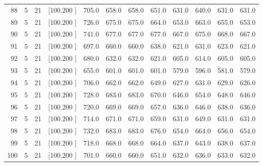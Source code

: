 \documentclass[12pt,a4paper]{article}
\begin{document}
\begin{center}
{\begin{tabular}{r r r r r r r r r r r r}
  88&  5& 21&[100.200   ]&   705.0&   658.0&   658.0&   651.0&   631.0&   640.0&   631.0&   631.0\\[-0.02in]
  89&  5& 21&[100.200   ]&   726.0&   675.0&   675.0&   664.0&   653.0&   663.0&   655.0&   653.0\\[-0.02in]
  90&  5& 21&[100.200   ]&   741.0&   677.0&   677.0&   677.0&   667.0&   675.0&   668.0&   667.0\\[-0.02in]
  91&  5& 21&[100.200   ]&   697.0&   660.0&   660.0&   638.0&   621.0&   631.0&   623.0&   621.0\\[-0.02in]
  92&  5& 21&[100.200   ]&   680.0&   632.0&   632.0&   621.0&   605.0&   614.0&   605.0&   605.0\\[-0.02in]
  93&  5& 21&[100.200   ]&   655.0&   601.0&   601.0&   601.0&   579.0&   596.0&   581.0&   579.0\\[-0.02in]
  94&  5& 21&[100.200   ]&   706.0&   662.0&   662.0&   649.0&   627.0&   631.0&   629.0&   626.0\\[-0.02in]
  95&  5& 21&[100.200   ]&   728.0&   683.0&   683.0&   670.0&   646.0&   654.0&   648.0&   646.0\\[-0.02in]
  96&  5& 21&[100.200   ]&   720.0&   669.0&   669.0&   657.0&   636.0&   646.0&   638.0&   636.0\\[-0.02in]
  97&  5& 21&[100.200   ]&   714.0&   671.0&   671.0&   659.0&   631.0&   649.0&   631.0&   631.0\\[-0.02in]
  98&  5& 21&[100.200   ]&   732.0&   683.0&   683.0&   676.0&   654.0&   664.0&   656.0&   654.0\\[-0.02in]
  99&  5& 21&[100.200   ]&   718.0&   668.0&   668.0&   664.0&   637.0&   643.0&   638.0&   637.0\\[-0.02in]
 100&  5& 21&[100.200   ]&   701.0&   660.0&   660.0&   651.0&   632.0&   636.0&   633.0&   632.0\\[-0.02in]

\hline
\end{tabular}}
\end{center}
\end{document}
